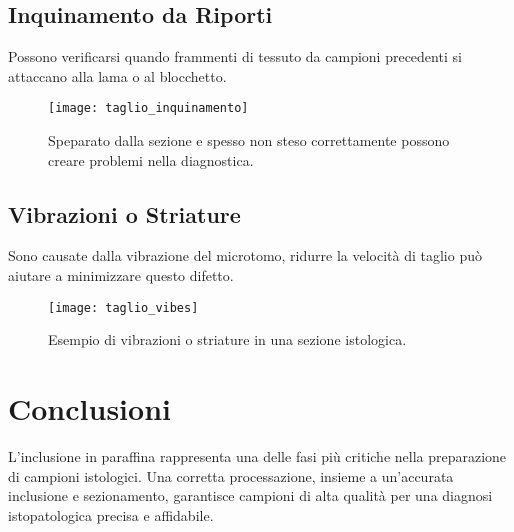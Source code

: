 \subsection{Inquinamento da Riporti}

Possono verificarsi quando frammenti di tessuto da campioni precedenti si attaccano alla lama o al blocchetto.

\begin{figure}[h]
\centering  
\texttt{[image: taglio\_inquinamento]}
\caption{Speparato dalla sezione e spesso non steso correttamente possono creare problemi nella diagnostica.}
\end{figure}

\subsection{Vibrazioni o Striature}

Sono causate dalla vibrazione del microtomo, ridurre la velocità di taglio può aiutare a minimizzare questo difetto.

\begin{figure}[h]
\centering  
\texttt{[image: taglio\_vibes]}
\caption{Esempio di vibrazioni o striature in una sezione istologica.}
\end{figure}


\section{Conclusioni}

L'inclusione in paraffina rappresenta una delle fasi più critiche nella preparazione di campioni istologici. Una corretta processazione, insieme a un'accurata inclusione e sezionamento, garantisce campioni di alta qualità per una diagnosi istopatologica precisa e affidabile.


